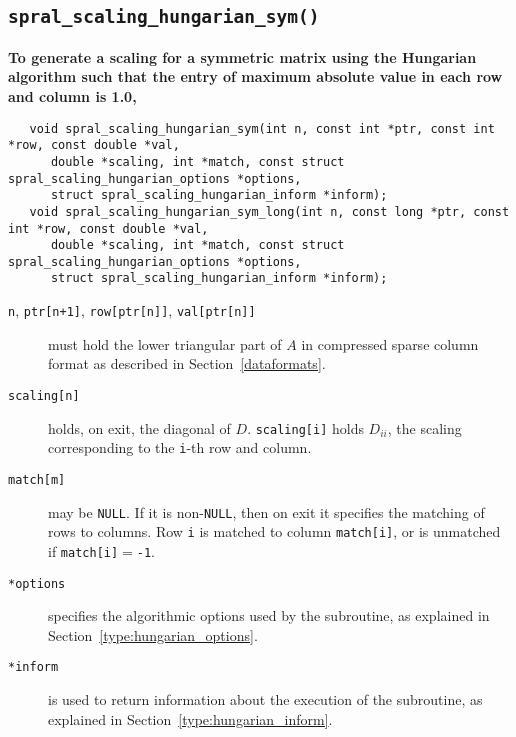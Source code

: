 \subsection{\texttt{spral\_scaling\_hungarian\_sym()}}

\textbf{\noindent
   To generate a scaling for a symmetric matrix using the Hungarian algorithm such that the entry of maximum absolute value in each row and column is 1.0,
}
\vspace*{-0.1cm}
\begin{verbatim}
   void spral_scaling_hungarian_sym(int n, const int *ptr, const int *row, const double *val,
      double *scaling, int *match, const struct spral_scaling_hungarian_options *options,
      struct spral_scaling_hungarian_inform *inform);
   void spral_scaling_hungarian_sym_long(int n, const long *ptr, const int *row, const double *val,
      double *scaling, int *match, const struct spral_scaling_hungarian_options *options,
      struct spral_scaling_hungarian_inform *inform);
\end{verbatim}

\begin{description}

\item[\texttt{n}, \texttt{ptr[n+1]}, \texttt{row[ptr[n]]}, \texttt{val[ptr[n]]}] must hold the lower triangular part of $A$ in compressed sparse column format as described in Section~\ref{dataformats}.

\item[\texttt{scaling[n]}] holds, on exit, the diagonal of $D$.
\texttt{scaling[i]} holds $D_{ii}$, the scaling corresponding to the
\texttt{i}-th row and column.

\item[\texttt{match[m]}] may be \texttt{NULL}. If it is non-\texttt{NULL},
then on exit it specifies the matching of rows to columns.
Row \texttt{i} is matched to column \texttt{match[i]}, or is unmatched
if \texttt{match[i]}$=$\texttt{-1}.

\item[\texttt{*options}] specifies the algorithmic options used by the subroutine, as explained in Section~\ref{type:hungarian_options}.

\item[\texttt{*inform}] is used to return information about the execution of the subroutine, as explained in Section~\ref{type:hungarian_inform}.


\end{description}

